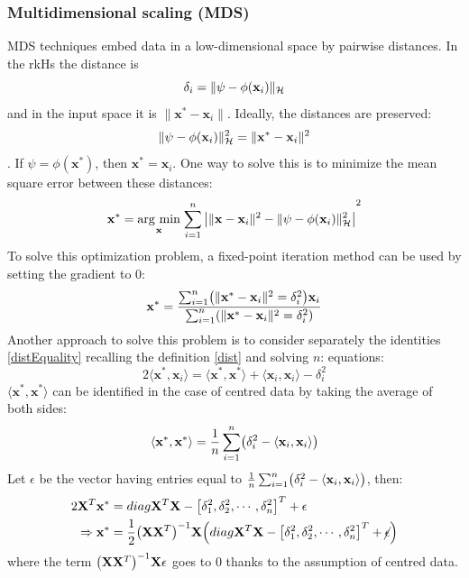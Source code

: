 \documentclass[12pt, letterpaper]{article}
\theoremstyle{definition}
\newcommand{\X}{\mathrm{\mathbf{X}}}
\newcommand{\x}{\mathbf{x}}
\DeclarePairedDelimiter\autobracket{(}{)}
\newcommand{\br}[1]{\autobracket*{#1}}
\newcommand{\argmin}[1]{\underset{#1}{\operatorname{arg}\,\operatorname{min}}\;}
\begin{document}
\subsubsection{Multidimensional scaling (MDS)}
MDS techniques embed data in a low-dimensional space by pairwise distances. In the rkHs the distance is 
\begin{equation}
\label{dist}
\delta_i = \|\psi- \phi(\x_i)\|_\CMcal{H}
\end{equation}
 and in the input space it is $\|\x^* - \x_i\|$. Ideally, the distances are preserved: 
 \begin{equation}
 \label{distEquality}
 \|\psi- \phi(\x_i)\|_\CMcal{H}^2 = \|\x^* - \x_i\|^2
 \end{equation}.
If $\psi = \phi(\x^*)$, then $\x^* = \x_i$. One way to solve this is to minimize the mean square error between these distances:
\begin{equation}
\x^* = \argmin{\x}{\sum_{i=1}^n \left| \|\x-\x_i\|^2 - \|\psi-\phi(\x_i) \|_\CMcal{H}^2 \right|}^2
\end{equation}
To solve this optimization problem, a fixed-point iteration method can be used by setting the gradient to $0$:
\begin{equation}
\x^* = \frac{\sum_{i=1}^n \br{\|\x^* - \x_i\|^2 = \delta_i^2}\x_i}{\sum_{i=1}^n \br{\|\x^* - \x_i\|^2 = \delta_i^2}}
\end{equation}
Another approach to solve this problem is to consider separately the identities \autoref{distEquality} recalling the definition \autoref{dist} and solving $n$:
 equations:
\begin{equation}
2\langle \x^*, \x_i\rangle=\langle \x^*, \x^*\rangle +\langle \x_i,  \x_i\rangle-\delta_i^2
\end{equation}
$\langle \x^*, \x^*\rangle $ can be identified in the case of centred data by taking the average of both sides:
\begin{equation}
\langle \x^*, \x^*\rangle  = \frac{1}{n}  \sum_{i=1}^n\br{\delta_i^2- \langle \x_i, \x_i\rangle }
\end{equation}
Let $\epsilon$ be the vector having entries equal to $\frac{1}{n}\sum_{i=1}^n\br{\delta_i^2-\langle \x_i, \x_i\rangle }$, then:
\begin{equation}
\begin{aligned}
2\X^T\x^* &= diag{\X^T \X} - \left[\delta_1^2, \delta_2^2, \cdots, \delta_n^2\right]^T+\epsilon\\
\Rightarrow \x^* &= \frac{1}{2}\br{\X\X^T}^{-1}\X\br{diag{\X^T \X} - \left[\delta_1^2, \delta_2^2, \cdots, \delta_n^2\right]^T+\cancel{\epsilon}}
\end{aligned}
\end{equation}
where the term $\br{\X\X^T}^{-1}\X\epsilon$ goes to $0$ thanks to the assumption of centred data.
\end{document}
